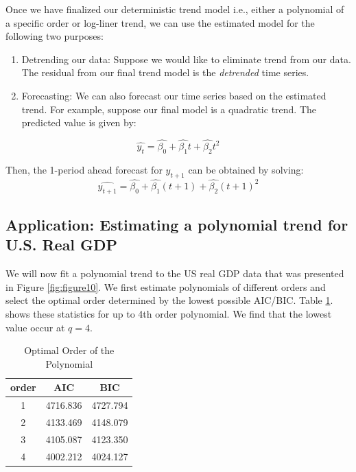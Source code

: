 \documentclass[]{book}
\theoremstyle{definition}
\theoremstyle{definition}
\theoremstyle{definition}
\theoremstyle{remark}
\begin{document}
Once we have finalized our deterministic trend model i.e., either a
polynomial of a specific order or log-liner trend, we can use the
estimated model for the following two purposes:

\begin{enumerate}
\def\labelenumi{\arabic{enumi}.}
\item
  Detrending our data: Suppose we would like to eliminate trend from our
  data. The residual from our final trend model is the \emph{detrended}
  time series.
\item
  Forecasting: We can also forecast our time series based on the
  estimated trend. For example, suppose our final model is a quadratic
  trend. The predicted value is given by:
\end{enumerate}

\begin{equation}
\widehat{y_t}=\widehat{\beta_0}+\widehat{\beta_1} t + \widehat{\beta_2} t^2
\end{equation}

Then, the 1-period ahead forecast for \(y_{t+1}\) can be obtained by
solving: \begin{equation}
\widehat{y_{t+1}}=\widehat{\beta_0}+\widehat{\beta_1} (t+1) + \widehat{\beta_2} (t+1)^2
\end{equation}

\hypertarget{application-estimating-a-polynomial-trend-for-u.s.-real-gdp}{%
\subsection{Application: Estimating a polynomial trend for U.S. Real
GDP}\label{application-estimating-a-polynomial-trend-for-u.s.-real-gdp}}

We will now fit a polynomial trend to the US real GDP data that was
presented in Figure \ref{fig:figure10}. We first estimate polynomials of
different orders and select the optimal order determined by the lowest
possible AIC/BIC. Table \ref{tab:ch5-table1}. shows these statistics for
up to 4th order polynomial. We find that the lowest value occur at
\(q=4\).

\begin{table}

\caption{\label{tab:ch5-table1}Optimal Order of the Polynomial}
\centering
\begin{tabular}[t]{ccc}
\toprule
order & AIC & BIC\\
\midrule
1 & 4716.836 & 4727.794\\
2 & 4133.469 & 4148.079\\
3 & 4105.087 & 4123.350\\
4 & 4002.212 & 4024.127\\
\bottomrule
\end{tabular}
\end{table}
\end{document}
